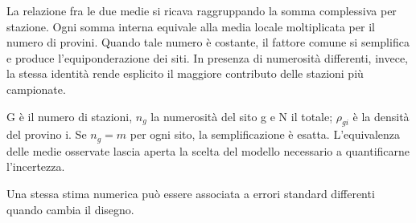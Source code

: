 \documentclass[12pt,aspectratio=1610]{beamer}
\begin{document}
\begin{lrbox}{\BodyBox}\begin{minipage}[t]{10.25cm}\raggedright\sloppy\color{Ink}\fontsize{12.4}{16.4}\selectfont La relazione fra le due medie si ricava raggruppando la somma complessiva per stazione. Ogni somma interna equivale alla media locale moltiplicata per il numero di provini. Quando tale numero è costante, il fattore comune si semplifica e produce l’equiponderazione dei siti. In presenza di numerosità differenti, invece, la stessa identità rende esplicito il maggiore contributo delle stazioni più campionate.\par{}\end{minipage}\end{lrbox}
\begin{lrbox}{\SideBox}\begin{minipage}[t]{7.45cm}\raggedright\sloppy\color{Ink}\fontsize{12.2}{16.1}\selectfont G è il numero di stazioni, $n_g$ la numerosità del sito g e N il totale; $\rho_{gi}$ è la densità del provino i. Se $n_g=m$ per ogni sito, la semplificazione è esatta. L’equivalenza delle medie osservate lascia aperta la scelta del modello necessario a quantificarne l’incertezza.\par{}\end{minipage}\end{lrbox}
\begin{lrbox}{\RecallBox}\begin{minipage}[t]{16.45cm}\raggedright\sloppy\color{Ink}\fontsize{10.1}{13.2}\selectfont Una stessa stima numerica può essere associata a errori standard differenti quando cambia il disegno.\end{minipage}\end{lrbox}
\end{document}
